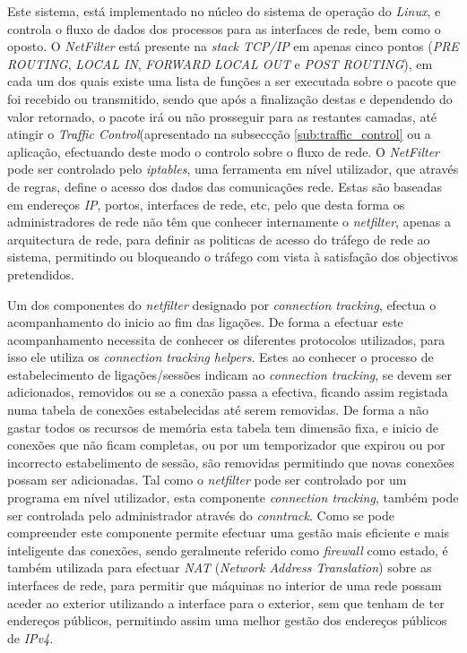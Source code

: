 Este sistema, está implementado no núcleo do sistema de operação do \textit{Linux}, e controla o fluxo de dados dos processos para as interfaces de rede, bem como o oposto.
O \textit{NetFilter} está presente na \textit{stack TCP/IP} em apenas cinco pontos (\textit{PRE ROUTING}, \textit{LOCAL IN}, \textit{FORWARD} \textit{LOCAL OUT} e \textit{POST ROUTING}), em cada um dos quais existe uma lista de funções a ser executada sobre o pacote que foi recebido ou transmitido, sendo que após a finalização destas e dependendo do valor retornado, o pacote irá ou não prosseguir para as restantes camadas, até atingir o \textit{Traffic Control}(apresentado na subseccção \ref{sub:traffic_control} ou a aplicação, efectuando deste modo o controlo sobre o fluxo de rede.
O \textit{NetFilter} pode ser controlado pelo \textit{iptables}, uma ferramenta em nível utilizador, que através de regras, define o acesso dos dados das comunicações rede.
Estas são baseadas em endereços \textit{IP}, portos, interfaces de rede, etc, pelo que desta forma os administradores de rede não têm que conhecer internamente o \textit{netfilter}, apenas a arquitectura de rede, para definir as politicas de acesso do tráfego de rede ao sistema, permitindo ou bloqueando o tráfego com vista à satisfação dos objectivos pretendidos. 

Um dos componentes do \textit{netfilter} designado por \textit{connection tracking}, efectua o acompanhamento do inicio ao fim das ligações.
De forma a efectuar este acompanhamento necessita de conhecer os diferentes protocolos utilizados, para isso ele utiliza os \textit{connection tracking helpers}.
Estes ao conhecer o processo de estabelecimento de ligações/sessões indicam ao \textit{connection tracking}, se devem ser adicionados, removidos ou se a conexão passa a efectiva, ficando assim registada numa tabela de conexões estabelecidas até serem removidas.
De forma a não gastar todos os recursos de memória esta tabela tem dimensão fixa, e inicio de conexões que não ficam completas, ou por um temporizador que expirou ou por incorrecto estabelimento de sessão, são removidas permitindo que novas conexões possam ser adicionadas.
Tal como o \textit{netfilter} pode ser controlado por um programa em nível utilizador, esta componente \textit{connection tracking}, também pode ser controlada pelo administrador através do \textit{conntrack}.
Como se pode compreender este componente permite efectuar uma gestão mais eficiente e mais inteligente das conexões, sendo geralmente referido como \textit{firewall} como estado, é também utilizada para efectuar \textit{NAT} (\textit{Network Address Translation}) sobre as interfaces de rede, para permitir que máquinas no interior de uma rede possam aceder ao exterior utilizando a interface para o exterior, sem que tenham de ter endereços públicos, permitindo assim uma melhor gestão dos endereços públicos de \textit{IPv4}.


